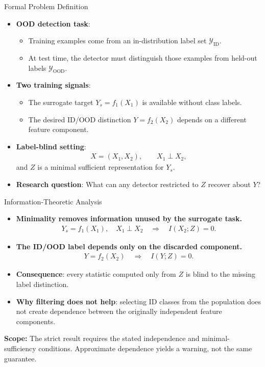 \documentclass[aspectratio=1610]{beamer}
\newcommand{\scopefooter}[1]{%
  \vfill
  \begin{center}
    \footnotesize\textbf{Scope:} #1
  \end{center}%
}
\begin{document}
\begin{frame}{Formal Problem Definition}
\begin{itemize}
  \item \textbf{OOD detection task}:
  \begin{itemize}
    \item Training examples come from an in-distribution label set $\mathcal{Y}_{\mathrm{ID}}$.
    \item At test time, the detector must distinguish those examples from held-out labels $\mathcal{Y}_{\mathrm{OOD}}$.
  \end{itemize}
  \item \textbf{Two training signals}:
  \begin{itemize}
    \item The surrogate target $Y_s=f_1(X_1)$ is available without class labels.
    \item The desired ID/OOD distinction $Y=f_2(X_2)$ depends on a different feature component.
  \end{itemize}
  \item \textbf{Label-blind setting}:
  \begin{align*}
    X=(X_1,X_2),\qquad X_1\perp X_2,
  \end{align*}
  and $Z$ is a minimal sufficient representation for $Y_s$.
  \item \textbf{Research question}: What can any detector restricted to $Z$ recover about $Y$?
\end{itemize}
\end{frame}

\begin{frame}{Information-Theoretic Analysis}
\begin{itemize}
  \item \textbf{Minimality removes information unused by the surrogate task.}
  \begin{align*}
    Y_s=f_1(X_1),\quad X_1\perp X_2
    \quad\Longrightarrow\quad I(X_2;Z)=0.
  \end{align*}
  \item \textbf{The ID/OOD label depends only on the discarded component.}
  \begin{align*}
    Y=f_2(X_2)
    \quad\Longrightarrow\quad I(Y;Z)=0.
  \end{align*}
  \item \textbf{Consequence}: every statistic computed only from $Z$ is blind to the missing label distinction.
  \item \textbf{Why filtering does not help}: selecting ID classes from the population does not create dependence between the originally independent feature components.
\end{itemize}
\scopefooter{The strict result requires the stated independence and minimal-sufficiency conditions. Approximate dependence yields a warning, not the same guarantee.}
\end{frame}
\end{document}
